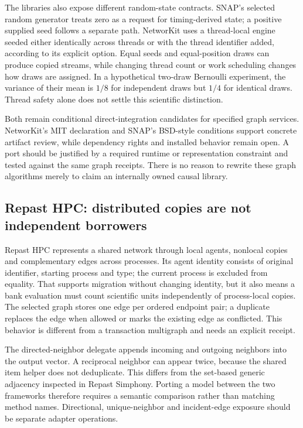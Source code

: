 The libraries also expose different random-state contracts. SNAP's selected random generator treats zero as a request for timing-derived state; a positive supplied seed follows a separate path. NetworKit uses a thread-local engine seeded either identically across threads or with the thread identifier added, according to its explicit option. Equal seeds and equal-position draws can produce copied streams, while changing thread count or work scheduling changes how draws are assigned. In a hypothetical two-draw Bernoulli experiment, the variance of their mean is $1/8$ for independent draws but $1/4$ for identical draws. Thread safety alone does not settle this scientific distinction.~\citep{exec25_cnet_snap,exec25_cnet_networkit,exec25_cnet_choice}

Both remain conditional direct-integration candidates for specified graph services. NetworKit's MIT declaration and SNAP's BSD-style conditions support concrete artifact review, while dependency rights and installed behavior remain open. A port should be justified by a required runtime or representation constraint and tested against the same graph receipts. There is no reason to rewrite these graph algorithms merely to claim an internally owned causal library.~\citep{exec25_cnet_networkit,exec25_cnet_snap,exec25_cnet_choice}

\subsection{Repast HPC: distributed copies are not independent borrowers}

Repast HPC represents a shared network through local agents, nonlocal copies and complementary edges across processes. Its agent identity consists of original identifier, starting process and type; the current process is excluded from equality. That supports migration without changing identity, but it also means a bank evaluation must count scientific units independently of process-local copies. The selected graph stores one edge per ordered endpoint pair; a duplicate replaces the edge when allowed or marks the existing edge as conflicted. This behavior is different from a transaction multigraph and needs an explicit receipt.~\citep{exec25_cnet_repast}

The directed-neighbor delegate appends incoming and outgoing neighbors into the output vector. A reciprocal neighbor can appear twice, because the shared item helper does not deduplicate. This differs from the set-based generic adjacency inspected in Repast Simphony. Porting a model between the two frameworks therefore requires a semantic comparison rather than matching method names. Directional, unique-neighbor and incident-edge exposure should be separate adapter operations.~\citep{exec25_cnet_repast,exec25_cnet_choice}

